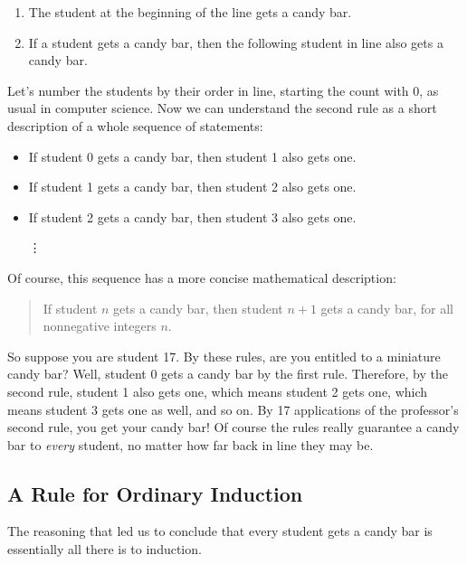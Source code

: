 \begin{enumerate}
\item The student at the beginning of the line gets a candy bar.
\item If a student gets a candy bar, then the following student in line
  also gets a candy bar.
\end{enumerate}
%
Let's number the students by their order in line, starting the count with
0, as usual in computer science.  Now we can understand the second rule as
a short description of a whole sequence of statements:
%
\begin{itemize}
\item If student 0 gets a candy bar, then student 1 also gets one.
\item If student 1 gets a candy bar, then student 2 also gets one.
\item If student 2 gets a candy bar, then student 3 also gets one.

\hspace{1.2in} \vdots
\end{itemize}
%
Of course, this sequence has a more concise mathematical description:
\begin{quote}
  If student $n$ gets a candy bar, then student $n+1$ gets a
  candy bar, for all nonnegative integers $n$.
\end{quote}
So suppose you are student 17.  By these rules, are you entitled to a
miniature candy bar?  Well, student 0 gets a candy bar by the first
rule.  Therefore, by the second rule, student 1 also gets one, which
means student 2 gets one, which means student 3 gets one as well, and
so on.  By 17 applications of the professor's second rule, you get
your candy bar!  Of course the rules really guarantee a candy bar to
\emph{every} student, no matter how far back in line they may be.

\subsection{A Rule for Ordinary Induction}\label{ord_induction_subsec}

The reasoning that led us to conclude that every student gets a candy bar is 
essentially all there is to induction.
\iffalse
So our claim that all the Professor's students get a candy bar was simply
an application of the Induction Rule with $P(n)$ defined to be the
predicate, ``student $n$ gets a candy bar.''
\fi

